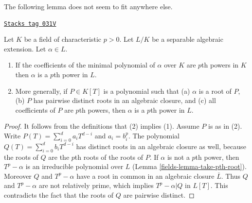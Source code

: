 The following lemma does not seem to fit anywhere else.

\begin{lemma}
\label{fields-lemma-pth-root}
\href{https://stacks.math.columbia.edu/tag/031V}{\texttt{Stacks tag 031V}}

Let $K$ be a field of characteristic $p > 0$. Let $L/K$ be a separable
algebraic extension. Let $\alpha \in L$.
\begin{enumerate}
\item If the coefficients of the minimal polynomial of $\alpha$
over $K$ are $p$th powers in $K$ then $\alpha$ is a $p$th
power in $L$.
\item More generally, if $P \in K[T]$ is a polynomial such that (a) $\alpha$
is a root of $P$, (b) $P$ has pairwise distinct roots in an algebraic closure,
and (c) all coefficients of $P$ are $p$th powers, then $\alpha$ is a
$p$th power in $L$.
\end{enumerate}
\end{lemma}

\begin{proof}

It follows from the definitions that (2) implies (1). Assume $P$ is as in (2).
Write $P(T) = \sum\nolimits_{i = 0}^d a_i T^{d - i}$ and $a_i = b_i^p$.
The polynomial $Q(T) = \sum\nolimits_{i = 0}^d b_i T^{d - i}$ has distinct
roots in an algebraic closure as well, because the roots of $Q$
are the $p$th roots of the roots of $P$. If $\alpha$ is not a $p$th power,
then $T^p - \alpha$ is an irreducible polynomial over $L$
(Lemma \ref{fields-lemma-take-pth-root}).
Moreover $Q$ and $T^p - \alpha$ have a root in common in
an algebraic closure $\overline{L}$.
Thus $Q$ and $T^p - \alpha$ are not relatively prime, which
implies $T^p - \alpha | Q$ in $L[T]$. This contradicts the fact that
the roots of $Q$ are pairwise distinct.
\end{proof}



